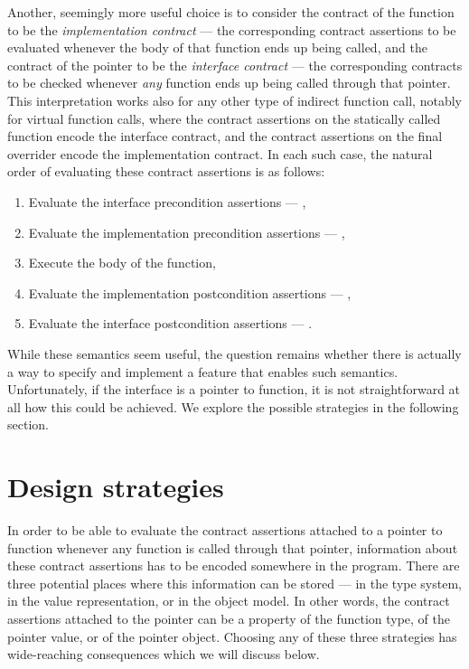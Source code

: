 Another, seemingly more useful choice is to consider the contract of the function to be the \emph{implementation contract} --- the corresponding contract assertions to be evaluated whenever the body of that function ends up being called, and the contract of the pointer to be the \emph{interface contract} --- the corresponding contracts to be checked whenever \emph{any} function ends up being called through that pointer. This interpretation works also for any other type of indirect function call, notably for virtual function calls, where the contract assertions on the statically called function encode the interface contract, and the contract assertions on the final overrider encode the implementation contract. In each such case, the natural order of evaluating these contract assertions is as follows:
\begin{enumerate}
\item Evaluate the interface precondition assertions --- ,
\item Evaluate the implementation precondition assertions --- ,
\item Execute the body of the function,
\item Evaluate the implementation postcondition assertions --- ,
\item Evaluate the interface postcondition assertions --- .
\end{enumerate}
While these semantics seem useful, the question remains whether there is actually a way to specify and implement a feature that enables such semantics. Unfortunately, if the interface is a pointer to function, it is not straightforward at all how this could be achieved. We explore the possible strategies in the following section.

\section{Design strategies}

In order to be able to evaluate the contract assertions attached to a pointer to function whenever any function is called through that pointer, information about these contract assertions has to be encoded somewhere in the program. There are three potential places where this information can be stored --- in the type system, in the value representation, or in the object model. In other words, the contract assertions attached to the pointer can be a property of the function type, of the pointer value, or of the pointer object. Choosing any of these three strategies has wide-reaching consequences which we will discuss below.

